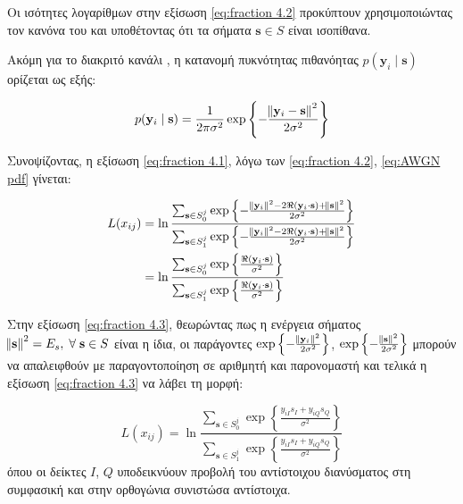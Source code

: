 Οι ισότητες λογαρίθμων στην εξίσωση \ref{eq:fraction 4.2} προκύπτουν χρησιμοποιώντας τον κανόνα του  και υποθέτοντας ότι τα σήματα $\mathbf{s} \in S$ είναι ισοπίθανα.

Ακόμη για το διακριτό κανάλι , η κατανομή πυκνότητας πιθανόητας $p(\mathbf{y}_i\mid\mathbf{s})$ ορίζεται ως εξής:

\begin{equation}
p(\mathbf{y}_i\mid\mathbf{s})=\frac{1}{2\pi\sigma^2}\exp\left\{-\frac{{\norm{\mathbf{y}_i-\mathbf{s}}}^{2}}{2\sigma^2}\right\}
\label{eq:AWGN pdf}
\end{equation}

Συνοψίζοντας, η εξίσωση \ref{eq:fraction 4.1}, λόγω των \ref{eq:fraction 4.2}, \ref{eq:AWGN pdf} γίνεται:

\begin{equation}
\begin{split}
L(x_{ij}) & =\ln \frac{\sum \nolimits_{\mathbf{s}\in{S}_0^j} \exp \left\{ -\frac{\norm{\mathbf{y}_i}^2 -2\Re(\mathbf{y}_i\cdot\mathbf{s}) + \norm{\mathbf{s}}^2}{2\sigma^2} \right\}}{\sum \nolimits_{\mathbf{s}\in{S}_1^j} \exp \left\{ -\frac{\norm{\mathbf{y}_i}^2 -2\Re(\mathbf{y}_i\cdot\mathbf{s}) + \norm{\mathbf{s}}^2}{2\sigma^2} \right\}} \\
& =\ln \frac{\sum \nolimits_{\mathbf{s}\in{S}_0^j} \exp \left\{ \frac{\Re(\mathbf{y}_i\cdot\mathbf{s})}{\sigma^2}\right\}}{\sum \nolimits_{\mathbf{s}\in{S}_1^j} \exp \left\{ \frac{\Re(\mathbf{y}_i\cdot\mathbf{s})}{\sigma^2}\right\}}
\end{split}
\label{eq:fraction 4.3}
\end{equation}

Στην εξίσωση \ref{eq:fraction 4.3}, θεωρώντας πως η ενέργεια σήματος $\norm{\mathbf{s}}^2=E_s,\;\forall \; \mathbf{s} \in S$ είναι η ίδια, οι παράγοντες $\exp\left\{-\frac{\norm{\mathbf{y}_i}^2}{2\sigma^2}\right\}$, $\exp\left\{-\frac{\norm{\mathbf{s}}^2}{2\sigma^2}\right\}$ μπορούν να απαλειφθούν με παραγοντοποίηση σε αριθμητή και παρονομαστή και τελικά η εξίσωση \ref{eq:fraction 4.3} να λάβει τη μορφή:

\begin{equation}
L(x_{ij})=\ln\frac{\sum \nolimits_{\mathbf{s}\in{S}_0^j}\exp\left\{\frac{y_{iI}s_I+y_{iQ}s_Q}{\sigma^2}\right\}}{\sum \nolimits_{\mathbf{s}\in{S}_1^j}\exp\left\{\frac{y_{iI}s_I+y_{iQ}s_Q}{\sigma^2}\right\}}
\label{eq:fraction 4.4}
\end{equation}
όπου οι δείκτες $I$, $Q$ υποδεικνύουν προβολή του αντίστοιχου διανύσματος στη συμφασική και στην ορθογώνια συνιστώσα αντίστοιχα.

